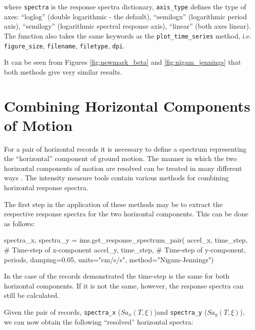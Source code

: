 \noindent where \verb=spectra= is the response spectra dictionary, \verb=axis_type= defines the type of axes: ``loglog'' (double logarithmic - the default), ``semilogx'' (logarithmic period axis), ``semilogy'' (logarithmic spectral response axis), ``linear'' (both axes linear). The function also takes the same keywords as the \verb=plot_time_series= method, i.e. \verb=figure_size=, \verb=filename=, \verb=filetype=, \verb=dpi=.

It can be seen from Figures  \ref{fig:newmark_beta} and \ref{fig:nigam_jennings} that both methods give very similar results.

\section{Combining Horizontal Components of Motion}
\label{sec:horizontal}

For a pair of horizontal records it is necessary to define a spectrum representing the ``horizontal'' component of ground motion. The manner in which the two horizontal components of motion are resolved can be treated in many different ways \citep[e.g.][]{Douglas2003, BeyerBommer2006}. The intensity measure tools contain various methods for combining horizontal response spectra. 

The first step in the application of these methods may be to extract the respective response spectra for the two horizontal components. This can be done as follows:

\begin{python}[frame=single]
spectra_x, spectra_y = ims.get_response_spectrum_pair(
    accel_x,
    time_step, # Time-step of x-component
    accel_y,
    time_step, # Time-step of y-component,
    periods,
    damping=0.05,
    units="cm/s/s",
    method="Nigam-Jennings")
\end{python}

In the case of the records demonstrated the time-step is the same for both horizontal components. If it is not the same, however, the response spectra can still be calculated.

Given the pair of records, \verb=spectra_x= ($Sa_x \left( {T, \xi} \right)$)and \verb=spectra_y= ($Sa_y \left( {T, \xi} \right)$), we can now obtain the following ``resolved'' horizontal spectra:

